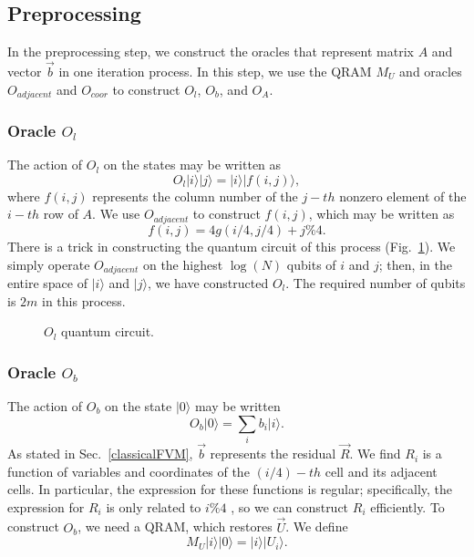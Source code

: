\documentclass[%
 reprint,
 amsmath,amssymb,
pra,
]{revtex4-1}
\begin{document}
\subsection{Preprocessing}
In the preprocessing step, we construct the oracles that represent matrix $A$ and vector $\vec{b}$ in one iteration process. In this step, we use the QRAM $M_U$ and oracles $O_{adjacent}$ and $O_{coor}$ to construct $O_l$, $O_b$, and $O_A$.

\subsubsection{Oracle $O_l$}
The action of $O_l$ on the states may be written as
\begin{equation}
O_l|i\rangle|j\rangle=|i\rangle|f(i,j)\rangle,
\end{equation}
where $f(i,j)$ represents the column number of the $j-th$ nonzero element of the $i-th$ row of $A$. We use $O_{adjacent}$ to construct $f(i,j)$, which may be written as
\begin{equation}
f(i,j)=4g(i/4,j/4)+j\%4.
\end{equation}
There is a trick in constructing the quantum circuit of this process (Fig.~\ref{fig:OL}). We simply operate $O_{adjacent}$ on the highest $\log(N)$ qubits of $i$ and $j$; then, in the entire space of $|i\rangle$ and $|j\rangle$, we have constructed $O_l$. The required number of qubits is $2m$ in this process.

\begin{figure}[htbp]
    \caption{$O_l$ quantum circuit. }
    \label{fig:OL}
\end{figure}

\subsubsection{Oracle $O_b$}
The action of $O_b$ on the state $|0\rangle$ may be written
\begin{equation}
O_b|0\rangle=\sum_i{b_i|i\rangle}.
\end{equation}
As stated in Sec.~\ref{classicalFVM}, $\vec{b}$ represents the residual $\vec{R}$. We find $R_i$ is a function of variables and coordinates of the $(i/4)-th$ cell and its adjacent cells. In particular, the expression for these functions is regular; specifically, the expression for $R_i$ is only related to $i\%4$ , so we can construct $R_i$ efficiently. To construct $O_b$, we need a QRAM, which restores $\vec{U}$. We define
\begin{equation}
M_U|i\rangle|0\rangle=|i\rangle|U_i\rangle.
\end{equation}
\end{document}
